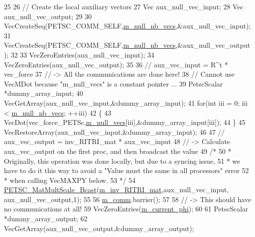 \begin{DoxyCode}
25 
26     \textcolor{comment}{// Create the local auxiliary vectors}
27     Vec aux\_null\_vec\_input;
28     Vec aux\_null\_vec\_output;
29 
30     VecCreateSeq(PETSC\_COMM\_SELF,\hyperlink{classcarl_1_1_f_e_t_i___operations_a6be71b08544858c4b4609bf2a2927a17}{m\_null\_nb\_vecs},&aux\_null\_vec\_input);
31     VecCreateSeq(PETSC\_COMM\_SELF,\hyperlink{classcarl_1_1_f_e_t_i___operations_a6be71b08544858c4b4609bf2a2927a17}{m\_null\_nb\_vecs},&aux\_null\_vec\_output);
32 
33     VecZeroEntries(aux\_null\_vec\_input);
34     VecZeroEntries(aux\_null\_vec\_output);
35 
36     \textcolor{comment}{// aux\_vec\_input = R^t * vec\_force}
37     \textcolor{comment}{// -> All the communications are done here!}
38     \textcolor{comment}{// Cannot use VecMDot because "m\_null\_vecs" is a constant pointer ...}
39     PetscScalar *dummy\_array\_input;
40     VecGetArray(aux\_null\_vec\_input,&dummy\_array\_input);
41     \textcolor{keywordflow}{for}(\textcolor{keywordtype}{int} iii = 0; iii < \hyperlink{classcarl_1_1_f_e_t_i___operations_a6be71b08544858c4b4609bf2a2927a17}{m\_null\_nb\_vecs}; ++iii)
42     \{
43         VecDot(vec\_force\_PETSc,\hyperlink{classcarl_1_1_f_e_t_i___operations_a81ca84aa058155a0a0f586625c6f93b7}{m\_null\_vecs}[iii],&dummy\_array\_input[iii]);
44     \}
45     VecRestoreArray(aux\_null\_vec\_input,&dummy\_array\_input);
46 
47     \textcolor{comment}{// aux\_vec\_output = inv\_RITRI\_mat * aux\_vec\_input}
48         \textcolor{comment}{// -> Calculate aux\_vec\_output on the first proc, and then broadcast the value}
49         \textcolor{comment}{/*    }
50 \textcolor{comment}{         *    Originally, this operation was done locally, but due to a syncing issue,}
51 \textcolor{comment}{         *    we have to do it this way to avoid a "Value must the same in all processors" error}
52 \textcolor{comment}{         *    when calling VecMAXPY below.}
53 \textcolor{comment}{         */}
54         \hyperlink{namespacecarl_a561696085e75f9b5013bf61e2ef3de9f}{PETSC\_MatMultScale\_Bcast}(\hyperlink{classcarl_1_1_f_e_t_i___operations_a5b61754f3ea2e4c674fd37f18ec0014b}{m\_inv\_RITRI\_mat},aux\_null\_vec\_input,
      aux\_null\_vec\_output,1);
55 
56     \hyperlink{classcarl_1_1_f_e_t_i___operations_a8cb0ed286667fc9f3ebc2d8ef2a3e13b}{m\_comm}.barrier();
57     
58     \textcolor{comment}{// -> This should have no communications at all!}
59     VecZeroEntries(\hyperlink{classcarl_1_1_f_e_t_i___operations_ac0f0857e6070cde78612b0ce5e1005e8}{m\_current\_phi});
60 
61     PetscScalar *dummy\_array\_output;
62     VecGetArray(aux\_null\_vec\_output,&dummy\_array\_output);

\end{DoxyCode}
